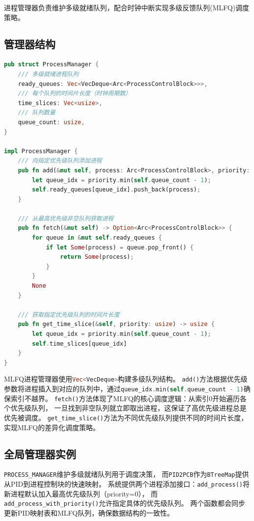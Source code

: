 进程管理器负责维护多级就绪队列，配合时钟中断实现多级反馈队列(MLFQ)调度策略。

\subsection{管理器结构}

\begin{lstlisting}[language=Rust,caption={MLFQ进程管理器结构}, label={lst:mlfq-process-manager}]
pub struct ProcessManager {
    /// 多级就绪进程队列
    ready_queues: Vec<VecDeque<Arc<ProcessControlBlock>>>,
    /// 每个队列的时间片长度（时钟周期数）
    time_slices: Vec<usize>,
    /// 队列数量
    queue_count: usize,
}

impl ProcessManager {
    /// 向指定优先级队列添加进程
    pub fn add(&mut self, process: Arc<ProcessControlBlock>, priority: usize) {
        let queue_idx = priority.min(self.queue_count - 1);
        self.ready_queues[queue_idx].push_back(process);
    }

    /// 从最高优先级非空队列获取进程
    pub fn fetch(&mut self) -> Option<Arc<ProcessControlBlock>> {
        for queue in &mut self.ready_queues {
            if let Some(process) = queue.pop_front() {
                return Some(process);
            }
        }
        None
    }

    /// 获取指定优先级队列的时间片长度
    pub fn get_time_slice(&self, priority: usize) -> usize {
        let queue_idx = priority.min(self.queue_count - 1);
        self.time_slices[queue_idx]
    }
}
\end{lstlisting}

MLFQ进程管理器使用\lstinline[language=Rust]{Vec<VecDeque>}构建多级队列结构。
\lstinline[language=Rust]{add()}方法根据优先级参数将进程插入到对应的队列中，通过\lstinline[language=Rust]{queue_idx.min(self.queue_count - 1)}确保索引不越界。
\lstinline[language=Rust]{fetch()}方法体现了MLFQ的核心调度逻辑：从索引0开始遍历各个优先级队列，
一旦找到非空队列就立即取出进程，这保证了高优先级进程总是优先被调度。
\lstinline[language=Rust]{get_time_slice()}方法为不同优先级队列提供不同的时间片长度，实现MLFQ的差异化调度策略。

\subsection{全局管理器实例}

\lstinline[language=Rust]{PROCESS_MANAGER}维护多级就绪队列用于调度决策，
而\lstinline[language=Rust]{PID2PCB}作为\lstinline[language=Rust]{BTreeMap}提供从PID到进程控制块的快速映射。
系统提供两个进程添加接口：\lstinline[language=Rust]{add_process()}将新进程默认加入最高优先级队列（priority=0），
而\lstinline[language=Rust]{add_process_with_priority()}允许指定具体的优先级队列。
两个函数都会同步更新PID映射表和MLFQ队列，确保数据结构的一致性。

